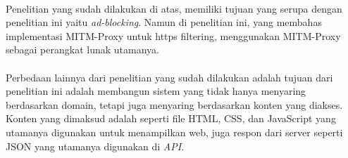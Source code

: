 \documentclass[./bab_2.tex]{subfiles}
\begin{document}

  \paragraph*{} Penelitian yang sudah dilakukan di atas,
  memiliki tujuan yang serupa dengan penelitian ini yaitu
  \textit{ad-blocking}. Namun di penelitian ini, yang
  membahas implementasi MITM-Proxy untuk https filtering,
  menggunakan MITM-Proxy sebagai perangkat lunak utamanya.
  
  \paragraph*{} Perbedaan lainnya dari penelitian yang sudah
  dilakukan adalah tujuan dari penelitian ini adalah
  membangun sistem yang tidak hanya menyaring berdasarkan
  domain, tetapi juga menyaring berdasarkan konten yang
  diakses. Konten yang dimaksud adalah seperti file HTML,
  CSS, dan JavaScript yang utamanya digunakan untuk
  menampilkan web, juga respon dari server seperti JSON yang
  utamanya digunakan di \textit{API}.
\end{document}
